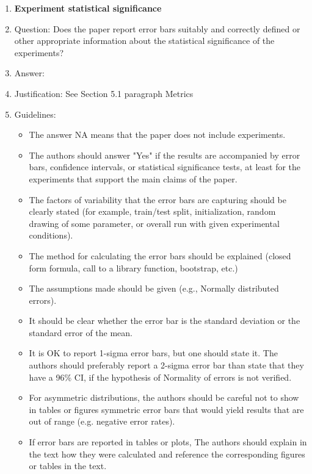 \documentclass{article}
\theoremstyle{plain}
\theoremstyle{definition}
\theoremstyle{remark}
\begin{document}
\begin{enumerate}
\item {\bf Experiment statistical significance}
    \item[] Question: Does the paper report error bars suitably and correctly defined or other appropriate information about the statistical significance of the experiments?
    \item[] Answer: \answerYes{} %
    \item[] Justification: See Section 5.1 paragraph Metrics
    \item[] Guidelines:
    \begin{itemize}
        \item The answer NA means that the paper does not include experiments.
        \item The authors should answer "Yes" if the results are accompanied by error bars, confidence intervals, or statistical significance tests, at least for the experiments that support the main claims of the paper.
        \item The factors of variability that the error bars are capturing should be clearly stated (for example, train/test split, initialization, random drawing of some parameter, or overall run with given experimental conditions).
        \item The method for calculating the error bars should be explained (closed form formula, call to a library function, bootstrap, etc.)
        \item The assumptions made should be given (e.g., Normally distributed errors).
        \item It should be clear whether the error bar is the standard deviation or the standard error of the mean.
        \item It is OK to report 1-sigma error bars, but one should state it. The authors should preferably report a 2-sigma error bar than state that they have a 96\% CI, if the hypothesis of Normality of errors is not verified.
        \item For asymmetric distributions, the authors should be careful not to show in tables or figures symmetric error bars that would yield results that are out of range (e.g. negative error rates).
        \item If error bars are reported in tables or plots, The authors should explain in the text how they were calculated and reference the corresponding figures or tables in the text.
    \end{itemize}


\end{enumerate}
\end{document}
